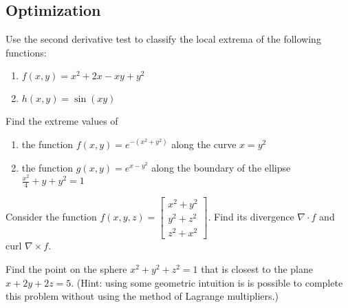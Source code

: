 
\newpage
\subsection{Optimization}

\BEN

\item

Use the second derivative test to classify the local extrema of the
following functions:
\begin{enumerate}
 \item $f(x,y) = x^2 + 2x - xy + y^2$
 \item $h(x,y) = \sin(xy)$
\end{enumerate}

\item

Find the extreme values of
\begin{enumerate}
 \item the function
  $f(x,y) = e^{-(x^2+y^2)}$
  along the curve $x = y^2$
 \item the function
  $g(x,y) = e^{x-y^2}$ along the boundary of the ellipse
  $\frac{x^2}{4}+y+y^2=1$
\end{enumerate}

\item

Consider the function $f(x,y,z) = \begin{bmatrix}
                                   x^2 + y^2 \\
                                   y^2 + z^2 \\
                                   z^2 + x^2
                                  \end{bmatrix}$.
Find its divergence $\nabla \cdot f$ and curl $\nabla \times f$.

\item

Find the point on the sphere $x^2 + y^2 + z^2 = 1$ that is closest
to the plane $x + 2y + 2z = 5$. (Hint: using some geometric intuition
is is possible to complete this problem without using the method of
Lagrange multipliers.)

